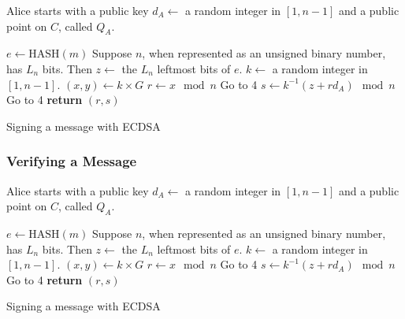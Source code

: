 Alice starts with a public key $d_A \gets$ a random integer in $[1, n-1]$
and a public point on $C$, called $Q_A$.

\begin{algorithm}
    \begin{algorithmic}[1]
        \State $e \gets \text{HASH}(m)$
        \State Suppose $n$, when represented as an unsigned binary number, has $L_n$ bits.
        Then $z \gets$ the $L_n$ leftmost bits of $e$.
        \State $k \gets$ a random integer in $[1, n-1]$.
        \State $(x,y) \gets k \times G$
        \State $r \gets x \mod n$
        \State Go to 4
        \EndIf
        \State $s \gets k^{-1}(z + rd_A) \mod n$
        \State Go to 4
        \EndIf
        \State \textbf{return} $(r, s)$
        \EndProcedure
    \end{algorithmic}
    \caption{Signing a message with ECDSA}
\end{algorithm}


\subsubsection{Verifying a Message}

Alice starts with a public key $d_A \gets$ a random integer in $[1, n-1]$
and a public point on $C$, called $Q_A$.

\begin{algorithm}
    \begin{algorithmic}[1]
        \State $e \gets \text{HASH}(m)$
        \State Suppose $n$, when represented as an unsigned binary number, has $L_n$ bits.
        Then $z \gets$ the $L_n$ leftmost bits of $e$.
        \State $k \gets$ a random integer in $[1, n-1]$.
        \State $(x,y) \gets k \times G$
        \State $r \gets x \mod n$
        \State Go to 4
        \EndIf
        \State $s \gets k^{-1}(z + rd_A) \mod n$
        \State Go to 4
        \EndIf
        \State \textbf{return} $(r, s)$
        \EndProcedure
    \end{algorithmic}
    \caption{Signing a message with ECDSA}
\end{algorithm}


